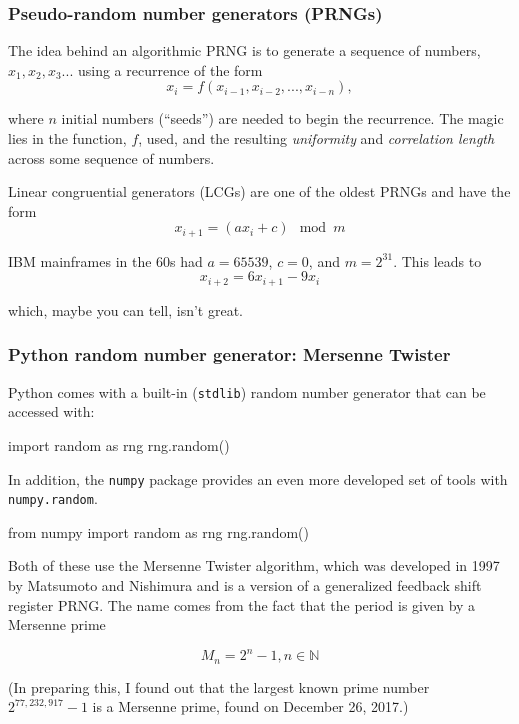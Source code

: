 \documentclass[hyperref={colorlinks=true}]{beamer}
\begin{document}
\begin{frame}%
  \frametitle{Pseudo-random number generators (PRNGs)}
  
  The idea behind an algorithmic PRNG is to generate a sequence of numbers, $x_1, x_2, x_3 ...$ using a recurrence of the form
  \begin{equation}
    x_i = f(x_{i-1}, x_{i-2}, ..., x_{i-n}),
  \end{equation}

  where $n$ initial numbers (``seeds'') are needed to begin the recurrence. The magic lies in the function, $f$, used, and the resulting \textit{uniformity} and \textit{correlation length} across some sequence of numbers. 
  
  Linear congruential generators (LCGs) are one of the oldest PRNGs and have the form
  \begin{equation}
    x_{i+1} = (a x_i + c) \mod m
  \end{equation}

  IBM mainframes in the 60s had $a = 65539$, $c = 0$, and $m = 2^{31}$. This leads to
  \begin{equation}
    x_{i+2} = 6 x_{i+1} - 9x_i
  \end{equation}

  which, maybe you can tell, isn't great. 

\end{frame}


\begin{frame}[fragile]%
  \frametitle{Python random number generator: Mersenne Twister}
  
  Python comes with a built-in (\texttt{stdlib}) random number generator that can be accessed with:
  
  \begin{ucpythonblock}{}
import random as rng
rng.random()  
  \end{ucpythonblock}

  In addition, the \texttt{numpy} package provides an even more developed set of tools with \texttt{numpy.random}. 
  
  \begin{ucpythonblock}{}
from numpy import random as rng
rng.random()  
  \end{ucpythonblock}  

  Both of these use the Mersenne Twister algorithm, which was developed in 1997 by Matsumoto and Nishimura and is a version of a generalized feedback shift register PRNG. The name comes from the fact that the period is given by a Mersenne prime 
  
  \begin{equation}
    M_n = 2^n - 1, n \in  \mathbb{N}
  \end{equation}

  (In preparing this, I found out that the largest known prime number $2^{77,232,917} - 1$ is a Mersenne prime, found on December 26, 2017.)

\end{frame}
\end{document}
